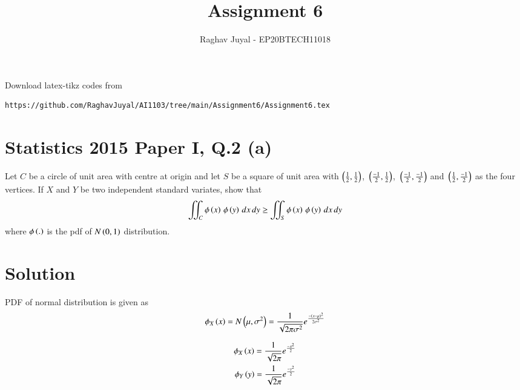 \documentclass[journal,12pt,twocolumn]{IEEEtran}
\begin{document}
\let\vec\mathbf
\renewcommand{\thefigure}{\theproblem}
\def\putbox#1#2#3{\makebox[0in][l]{\makebox[#1][l]{}\raisebox{\baselineskip}[0in][0in]{\raisebox{#2}[0in][0in]{#3}}}}
     \def\rightbox#1{\makebox[0in][r]{#1}}
     \def\centbox#1{\makebox[0in]{#1}}
     \def\topbox#1{\raisebox{-\baselineskip}[0in][0in]{#1}}
     \def\midbox#1{\raisebox{-0.5\baselineskip}[0in][0in]{#1}}
\vspace{3cm}
\title{Assignment 6}
\author{Raghav Juyal - EP20BTECH11018}
\maketitle
\newpage
\bigskip
\renewcommand{\thefigure}{\theenumi}
\renewcommand{\thetable}{\theenumi}
Download latex-tikz codes from 
%
\begin{lstlisting}
https://github.com/RaghavJuyal/AI1103/tree/main/Assignment6/Assignment6.tex
\end{lstlisting}
\section*{Statistics 2015 Paper I, Q.2 (a)}
Let $C$ be a circle of unit area with centre at origin and let $S$ be a square of unit area with $\left(\frac{1}{2},\frac{1}{2}\right)$, $\,\left(\frac{-1}{2},\frac{1}{2}\right)$, $\,\left(\frac{-1}{2},\frac{-1}{2}\right)$ and $\,\left(\frac{1}{2},\frac{-1}{2}\right)$ as the four vertices. If $X$ and $Y$ be two independent standard variates, show that
\begin{align*}
    \iint_C{\phi\left(x\right)\,\phi\left(y\right)\,dx\,dy} \geq \iint_S{\phi\left(x\right)\,\phi\left(y\right)\,dx\,dy}
\end{align*}
where $\phi\left(.\right)$ is the pdf of $N\left(0,1\right)$ distribution.
\section*{Solution}
\begin{definition}
PDF of normal distribution is given as
\begin{align}
    \phi_X\left(x\right) = N\left(\mu,\sigma^2\right) = \frac{1}{\sqrt{2\pi\sigma^2}}e^\frac{-\left(x-\mu\right)^2}{2\sigma^2}
\end{align}
\end{definition}

\begin{corollary}
\begin{align}
    \phi_X\left(x\right) = \frac{1}{\sqrt{2\pi}}e^\frac{-x^2}{2}\label{eq1}\\
    \phi_Y\left(y\right) = \frac{1}{\sqrt{2\pi}}e^\frac{-y^2}{2}\label{eq2}
\end{align}
\end{corollary}
\end{document}
